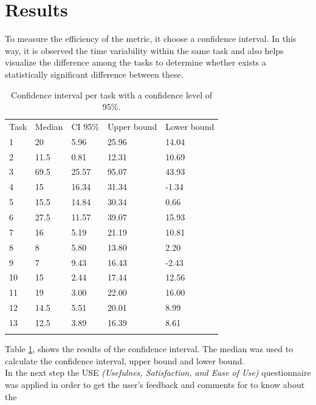 \section{Results}

To measure the efficiency of the metric, it choose a confidence
interval. In this way, it is observed the time variability within the
same task and also helps visualize the difference among the tasks to
determine whether exists a statistically significant difference
between these. 
\begin{table}
\centering
\small
\captionsetup{font=footnotesize}
\caption{Confidence interval per task with a confidence level of 95\%. }
\label{tab:ic}    
\begin{tabular}{lllll}
\hline\noalign{\smallskip}
Task  & Median & CI 95\% & Upper bound & Lower bound  \\
\noalign{\smallskip}\hline\noalign{\smallskip}
1 &    20         & 5.96  & 25.96 & 14.04  \\
2 &    11.5      & 0.81  & 12.31  & 10.69   \\
3 &    69.5      &  25.57   &  95.07  &  43.93   \\
4 &    15        & 16.34  &  31.34  &  -1.34   \\
5 &    15.5     &  14.84  &  30.34  &  0.66  \\
6 &     27.5    &   11.57  &  39.07  &  15.93    \\
7 &     16       &  5.19  & 21.19  &  10.81   \\
8 &     8         &   5.80  &  13.80  & 2.20 \\
9 &     7         & 9.43  &  16.43  &  -2.43  \\
10 &   15       &   2.44  &  17.44   &  12.56   \\
11 &   19       &  3.00  &  22.00  &  16.00   \\
12 &   14.5    &  5.51  &  20.01  &  8.99   \\
13 &   12.5    &  3.89  &  16.39  &  8.61    \\
\noalign{\smallskip}\hline
\end{tabular}
\end{table}
Table \ref{tab:ic}, shows the results of 
the confidence interval. The median was used to calculate the 
confidence interval, upper bound and lower bound.\\
In the next step the USE \textit{(Usefulnes, Satisfaction, and Ease of
Use)} questionnaire \cite{morris2001experience} was applied in order
to get the user's feedback and comments for to know about the
